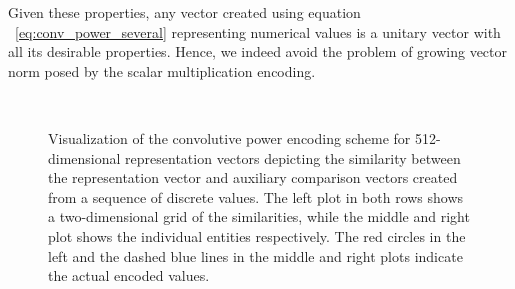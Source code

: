 Given these properties, any vector created using equation ~\ref{eq:conv_power_several} representing numerical values is a unitary vector with all its desirable properties.
Hence, we indeed avoid the problem of growing vector norm posed by the scalar multiplication encoding.

\begin{figure}[t]
    \centering
    \\
    \caption{
        Visualization of the convolutive power encoding scheme for \num{512}-dimensional representation vectors depicting the similarity between the representation vector and auxiliary comparison vectors created from a sequence of discrete values.
        The left plot in both rows shows a two-dimensional grid of the similarities, while the middle and right plot shows the individual entities respectively.
        The red circles in the left and the dashed blue lines in the middle and right plots indicate the
    actual encoded values.}
    \label{fig:spa_power_encoding}
\end{figure}

